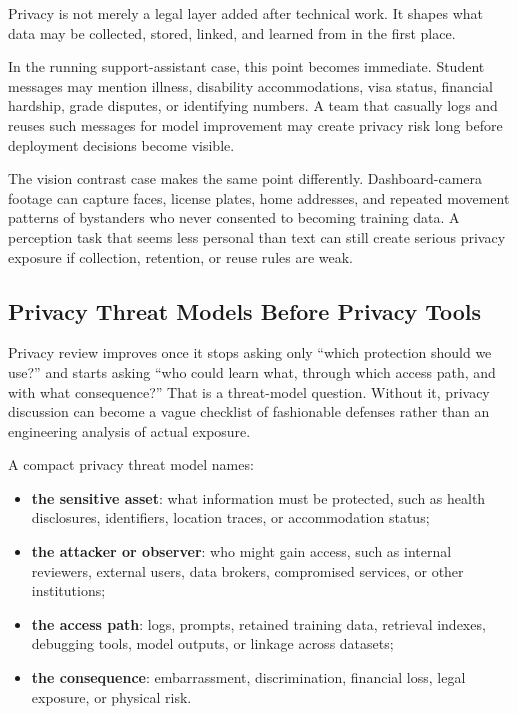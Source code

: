 Privacy is not merely a legal layer added after technical work. It shapes what data may be collected, stored, linked, and learned from in the first place.

In the running support-assistant case, this point becomes immediate. Student messages may mention illness, disability accommodations, visa status, financial hardship, grade disputes, or identifying numbers. A team that casually logs and reuses such messages for model improvement may create privacy risk long before deployment decisions become visible.

The vision contrast case makes the same point differently. Dashboard-camera footage can capture faces, license plates, home addresses, and repeated movement patterns of bystanders who never consented to becoming training data. A perception task that seems less personal than text can still create serious privacy exposure if collection, retention, or reuse rules are weak.

\subsection{Privacy Threat Models Before Privacy Tools}

Privacy review improves once it stops asking only ``which protection should we use?'' and starts asking ``who could learn what, through which access path, and with what consequence?'' That is a threat-model question. Without it, privacy discussion can become a vague checklist of fashionable defenses rather than an engineering analysis of actual exposure.

A compact privacy threat model names:
\begin{itemize}[leftmargin=*]
\item \textbf{the sensitive asset}: what information must be protected, such as health disclosures, identifiers, location traces, or accommodation status;
\item \textbf{the attacker or observer}: who might gain access, such as internal reviewers, external users, data brokers, compromised services, or other institutions;
\item \textbf{the access path}: logs, prompts, retained training data, retrieval indexes, debugging tools, model outputs, or linkage across datasets;
\item \textbf{the consequence}: embarrassment, discrimination, financial loss, legal exposure, or physical risk.
\end{itemize}


